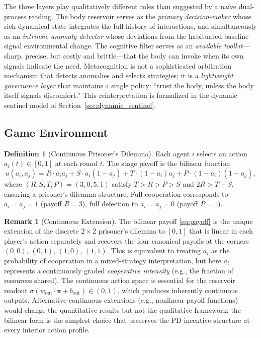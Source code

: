 \documentclass[11pt,a4paper]{article}
\theoremstyle{definition}
\newtheorem{definition}[theorem]{Definition}
\newtheorem{remark}[theorem]{Remark}
\newcommand{\Wout}{w_{\mathrm{out}}}
\newcommand{\xstate}{\mathbf{x}}
\newcommand{\bout}{b_{\mathrm{out}}}
\begin{document}
The three layers play qualitatively
different roles than suggested by a na\"ive dual-process reading.
The body reservoir serves as the \emph{primary decision-maker} whose rich
dynamical state integrates the full history of interactions, and simultaneously
as an \emph{intrinsic anomaly detector} whose deviations from the habituated
baseline signal environmental change.
The cognitive filter serves as an \emph{available toolkit}---sharp, precise, but costly and
brittle---that the body can invoke when its own signals indicate the need.
Metacognition is not a sophisticated arbitration mechanism that detects
anomalies and selects strategies; it is a \emph{lightweight governance layer}
that maintains a single policy: ``trust the body, unless the body itself
signals discomfort.''  This reinterpretation is formalized in the dynamic
sentinel model of Section~\ref{sec:dynamic_sentinel}.

\subsection{Game Environment}

\begin{definition}[Continuous Prisoner's Dilemma]
\label{def:cpd}
Each agent $i$ selects an action $a_i(t) \in [0,1]$ at each round $t$.
The stage payoff is the bilinear function
\begin{equation}
\label{eq:payoff}
u(a_i, a_j) = R \cdot a_i a_j + S \cdot a_i (1 - a_j)
  + T \cdot (1 - a_i) a_j + P \cdot (1 - a_i)(1 - a_j),
\end{equation}
where $(R, S, T, P) = (3, 0, 5, 1)$ satisfy $T > R > P > S$ and $2R > T + S$,
ensuring a prisoner's dilemma structure.  Full cooperation corresponds to
$a_i = a_j = 1$ (payoff $R = 3$), full defection to $a_i = a_j = 0$
(payoff $P = 1$).
\end{definition}

\begin{remark}[Continuous Extension]
\label{rem:continuous_pd}
The bilinear payoff \eqref{eq:payoff} is the unique extension of the
discrete $2 \times 2$ prisoner's dilemma to $[0,1]$ that is linear in
each player's action separately and recovers the four canonical payoffs at
the corners $(0,0)$, $(0,1)$, $(1,0)$, $(1,1)$.  This is equivalent to
treating $a_i$ as the probability of cooperation in a mixed-strategy
interpretation, but here $a_i$ represents a continuously graded
\emph{cooperative intensity} (e.g., the fraction of resources shared).
The continuous action space is essential for the reservoir readout
$\sigma(\Wout \cdot \xstate + \bout) \in (0,1)$, which produces
inherently continuous outputs.  Alternative continuous extensions (e.g.,
nonlinear payoff functions) would change the quantitative results but not
the qualitative framework; the bilinear form is the simplest choice that
preserves the PD incentive structure at every interior action profile.
\end{remark}
\end{document}
